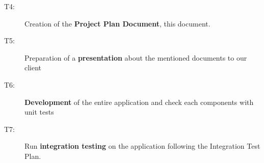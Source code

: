 \begin{description}
	\item[T4:] Creation of the \textbf{Project Plan Document}, this document.
	
	\item[T5:] Preparation of a \textbf{presentation} about the mentioned documents to our client
	
	\item[T6:] \textbf{Development} of the entire application and check each components with unit tests
	
	\item[T7:] Run \textbf{integration testing} on the application following the Integration Test Plan.
	
\end{description}
